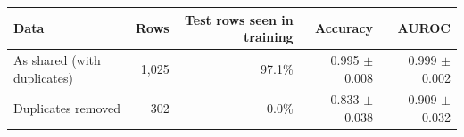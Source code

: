 \begin{tabular}{lrrrr}
\toprule
Data & Rows & Test rows seen in training & Accuracy & AUROC \\
\midrule
As shared (with duplicates) & 1,025 & 97.1\% & 0.995 $\pm$ 0.008 & 0.999 $\pm$ 0.002 \\
Duplicates removed & 302 & 0.0\% & 0.833 $\pm$ 0.038 & 0.909 $\pm$ 0.032 \\
\bottomrule
\end{tabular}
